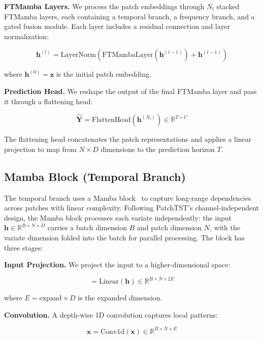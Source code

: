 \documentclass[symmetry,article,submit,pdftex,moreauthors]{Definitions/mdpi}
\begin{document}
\textbf{FTMamba Layers.} We process the patch embeddings through $N_l$ stacked FTMamba layers, each containing a temporal branch, a frequency branch, and a gated fusion module. Each layer includes a residual connection and layer normalization:
\begin{linenomath}
\begin{equation}
\mathbf{h}^{(l)} = \text{LayerNorm}(\text{FTMambaLayer}(\mathbf{h}^{(l-1)}) + \mathbf{h}^{(l-1)})
\end{equation}
\end{linenomath}
where $\mathbf{h}^{(0)} = \mathbf{z}$ is the initial patch embedding.

\textbf{Prediction Head.} We reshape the output of the final FTMamba layer and pass it through a flattening head:
\begin{linenomath}
\begin{equation}
\hat{\mathbf{Y}} = \text{FlattenHead}(\mathbf{h}^{(N_l)}) \in \mathbb{R}^{T \times C}
\end{equation}
\end{linenomath}
The flattening head concatenates the patch representations and applies a linear projection to map from $N \times D$ dimensions to the prediction horizon $T$.

\subsection{Mamba Block (Temporal Branch)}

The temporal branch uses a Mamba block~\cite{ref10} to capture long-range dependencies across patches with linear complexity. Following PatchTST's channel-independent design, the Mamba block processes each variate independently: the input $\mathbf{h} \in \mathbb{R}^{B \times N \times D}$ carries a batch dimension $B$ and patch dimension $N$, with the variate dimension folded into the batch for parallel processing. The block has three stages:

\textbf{Input Projection.} We project the input to a higher-dimensional space:
\begin{linenomath}
\begin{equation}
[\mathbf{x}, \mathbf{res}] = \text{Linear}(\mathbf{h}) \in \mathbb{R}^{B \times N \times 2E}
\end{equation}
\end{linenomath}
where $E = \text{expand} \times D$ is the expanded dimension.

\textbf{Convolution.} A depth-wise 1D convolution captures local patterns:
\begin{linenomath}
\begin{equation}
\mathbf{x} = \text{Conv1d}(\mathbf{x}) \in \mathbb{R}^{B \times N \times E}
\end{equation}
\end{linenomath}
\end{document}
